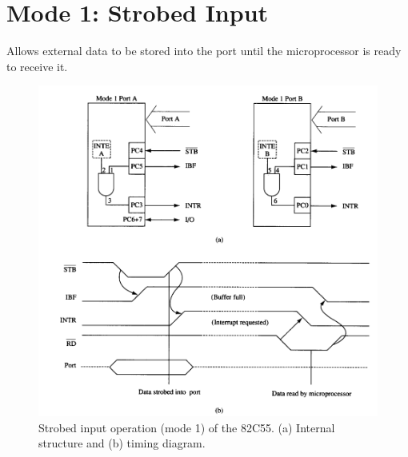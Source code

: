 \section{Mode 1: Strobed Input}
Allows external data to be stored into the port until the microprocessor is ready to receive it.
\begin{figure}[h!]
  \includegraphics[width = 1.2\textwidth]{./figures/Mode_1.png}
  \caption{Strobed input operation (mode 1) of the 82C55. (a) Internal structure and (b) timing diagram.}
\end{figure}

